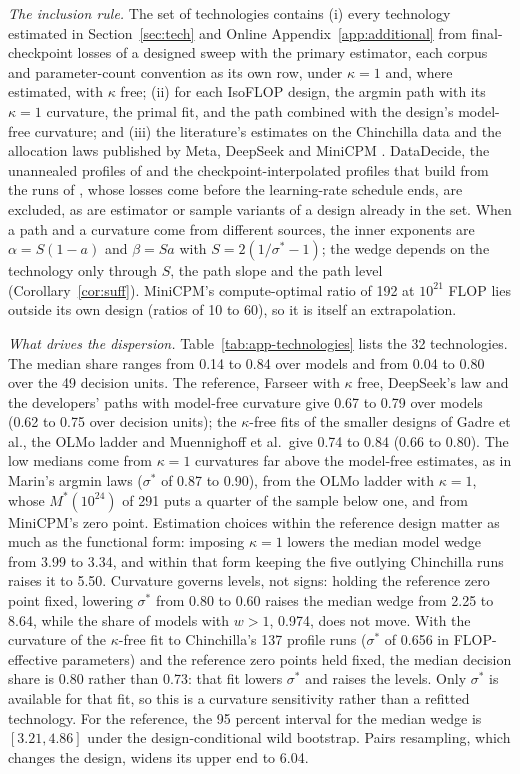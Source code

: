 \textit{The inclusion rule.} The set of technologies contains (i) every technology estimated in Section~\ref{sec:tech} and
Online Appendix~\ref{app:additional} from final-checkpoint losses of a designed sweep with the primary estimator, each
corpus and parameter-count convention as its own row, under $\kappa=1$ and, where estimated, with $\kappa$ free; (ii) for
each IsoFLOP design, the argmin path with its $\kappa=1$ curvature, the primal fit, and the path combined with the
design's model-free curvature; and (iii) the literature's estimates on the Chinchilla data and the allocation laws
published by Meta, DeepSeek \citep{bi2024deepseek} and MiniCPM \citep{hu2024minicpm}. DataDecide, the unannealed
profiles of \citet{porian2024resolving} and the checkpoint-interpolated profiles that \citet{czech2026problems} build
from the runs of \citet{li2025misfitting}, whose losses come before the learning-rate schedule ends, are excluded, as are
estimator or sample variants of a design already in the set. When a path and a curvature come from different sources,
the inner exponents are $\alpha=S(1-a)$ and $\beta=Sa$ with $S=2(1/\sigma^*-1)$; the wedge depends on the technology
only through $S$, the path slope and the path level (Corollary~\ref{cor:suff}). MiniCPM's compute-optimal ratio of 192 at
$10^{21}$ FLOP lies outside its own design (ratios of 10 to 60), so it is itself an extrapolation.

\textit{What drives the dispersion.} Table~\ref{tab:app-technologies} lists the 32 technologies. The median share ranges
from 0.14 to 0.84 over models and from 0.04 to 0.80 over the 49 decision units. The reference, Farseer with $\kappa$ free,
DeepSeek's law and the developers' paths with model-free curvature give 0.67 to 0.79 over models (0.62 to 0.75 over
decision units); the $\kappa$-free fits of the smaller designs of Gadre et al., the OLMo ladder and Muennighoff et al.\
give 0.74 to 0.84 (0.66 to 0.80). The low medians come from $\kappa=1$ curvatures far above the model-free estimates, as in
Marin's argmin laws ($\sigma^*$ of 0.87 to 0.90), from the OLMo ladder with $\kappa=1$, whose $M^*(10^{24})$ of 291 puts a
quarter of the sample below one, and from MiniCPM's zero point. Estimation choices within the reference design matter as
much as the functional form: imposing $\kappa=1$ lowers the median model wedge from 3.99 to 3.34, and within that form
keeping the five outlying Chinchilla runs raises it to 5.50. Curvature governs levels, not signs: holding the reference
zero point fixed, lowering $\sigma^*$ from 0.80 to 0.60 raises the median wedge from 2.25 to 8.64, while the share of
models with $w>1$, 0.974, does not move. With the curvature of the $\kappa$-free fit to Chinchilla's 137 profile runs
($\sigma^*$ of 0.656 in FLOP-effective parameters) and the reference zero points held fixed, the median decision share is
0.80 rather than 0.73: that fit lowers $\sigma^*$ and raises the levels. Only $\sigma^*$ is available for that fit, so this
is a curvature sensitivity rather than a refitted technology. For the reference, the 95 percent interval for the median
wedge is $[3.21,4.86]$ under the design-conditional wild bootstrap. Pairs resampling, which changes the design, widens its
upper end to 6.04.

